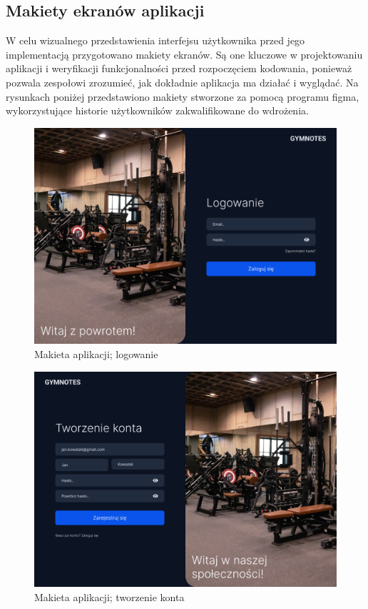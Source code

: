 \documentclass{article}
\begin{document}
      \subsection{Makiety ekranów aplikacji}
            W celu wizualnego przedstawienia interfejsu użytkownika przed jego implementacją przygotowano makiety ekranów. Są one kluczowe w projektowaniu aplikacji i weryfikacji funkcjonalności przed rozpoczęciem kodowania, ponieważ pozwala zespołowi zrozumieć, jak dokładnie aplikacja ma działać i wyglądać. Na rysunkach poniżej przedstawiono makiety stworzone za pomocą programu figma, wykorzystujące historie użytkowników zakwalifikowane do wdrożenia.
            \begin{figure}[ht]
                  \centering
                  \includegraphics[height=8cm]{Logowanie.png}
                  \caption{Makieta aplikacji; logowanie}
            \end{figure}
            \begin{figure}[ht]
                  \centering
                  \includegraphics[height=8cm]{Tworzenie konta.png}
                  \caption{Makieta aplikacji; tworzenie konta}
            \end{figure}
\end{document}
